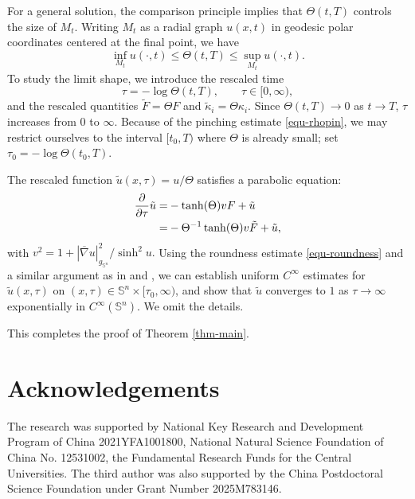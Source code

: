 \documentclass[11pt,reqno]{amsart}
\theoremstyle{remark}
\numberwithin{equation}{section}
\begin{document}
For a general solution, the comparison principle implies that $\Theta(t,T)$ controls the size of $M_t$. Writing $M_t$ as a radial graph $u(x,t)$ in geodesic polar coordinates centered at the final point, we have
\[
\inf_{M_t} u(\cdot,t) \le \Theta(t,T) \le \sup_{M_t} u(\cdot,t).
\]
To study the limit shape, we introduce the rescaled time
\begin{equation*}
	\tau = -\log\Theta(t,T),\qquad \tau\in[0,\infty),
\end{equation*}
and the rescaled quantities $\tilde{F}= \Theta F$ and $\tilde{\kappa}_i = \Theta\kappa_i.$ Since $\Theta(t,T)\to 0$ as $t\to T$,  $\tau$ increases from $0$ to $\infty$. Because of the pinching estimate \eqref{equ-rhopin}, we may restrict ourselves to the interval $[t_0,T)$ where $\Theta$ is already small; set $\tau_0 = -\log\Theta(t_0,T)$.

The rescaled function $\tilde{u}(x,\tau)=u/\Theta$ satisfies a parabolic equation:
\begin{align*}
	\dfrac{\partial}{\partial\tau}\tilde{u} =& -\tanh(\Theta)vF+ \tilde{u} \notag\\
	=& -\Theta^{-1}\tanh(\Theta)v \tilde{F} + \tilde{u},
\end{align*}
with $v^2 = 1 + {|\overline{\nabla}u|_{g_{\mathbb{S}^n}}^2}/{\sinh^2 u}.$ Using the roundness estimate \eqref{equ-roundness} and a similar argument as in \cite[\S 7-8]{Ger15} and \cite[\S 7-8]{Yu16}, we can establish uniform $C^\infty$ estimates for $\tilde{u}(x,\tau)$ on $(x,\tau)\in \mathbb{S}^n \times [\tau_0,\infty)$, and show that $\tilde{u}$ converges to $1$ as $\tau\to\infty$ exponentially in $C^\infty(\mathbb{S}^n)$. We omit the details. 

This completes the proof of Theorem \ref{thm-main}.


\section*{Acknowledgements}
The research was supported by National Key Research and Development Program of China 2021YFA1001800, National Natural Science Foundation of China No. 12531002, the Fundamental Research Funds for the Central Universities. The third author was also supported by the China Postdoctoral Science Foundation under Grant Number 2025M783146.


%
%

\end{document}
